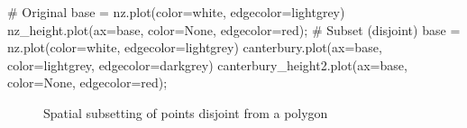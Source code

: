 \documentclass[
  letterpaper,
]{krantz}
\newenvironment{Shaded}{\begin{snugshade}}{\end{snugshade}}
\newcommand{\CommentTok}[1]{\textcolor[rgb]{0.37,0.37,0.37}{#1}}
\newcommand{\NormalTok}[1]{\textcolor[rgb]{0.00,0.23,0.31}{#1}}
\newcommand{\OperatorTok}[1]{\textcolor[rgb]{0.37,0.37,0.37}{#1}}
\newcommand{\StringTok}[1]{\textcolor[rgb]{0.13,0.47,0.30}{#1}}
\begin{document}
\begin{Shaded}
\begin{Highlighting}[]
\CommentTok{\# Original}
\NormalTok{base }\OperatorTok{=}\NormalTok{ nz.plot(color}\OperatorTok{=}\StringTok{\textquotesingle{}white\textquotesingle{}}\NormalTok{, edgecolor}\OperatorTok{=}\StringTok{\textquotesingle{}lightgrey\textquotesingle{}}\NormalTok{)}
\NormalTok{nz\_height.plot(ax}\OperatorTok{=}\NormalTok{base, color}\OperatorTok{=}\StringTok{\textquotesingle{}None\textquotesingle{}}\NormalTok{, edgecolor}\OperatorTok{=}\StringTok{\textquotesingle{}red\textquotesingle{}}\NormalTok{)}\OperatorTok{;}
\CommentTok{\# Subset (disjoint)}
\NormalTok{base }\OperatorTok{=}\NormalTok{ nz.plot(color}\OperatorTok{=}\StringTok{\textquotesingle{}white\textquotesingle{}}\NormalTok{, edgecolor}\OperatorTok{=}\StringTok{\textquotesingle{}lightgrey\textquotesingle{}}\NormalTok{)}
\NormalTok{canterbury.plot(ax}\OperatorTok{=}\NormalTok{base, color}\OperatorTok{=}\StringTok{\textquotesingle{}lightgrey\textquotesingle{}}\NormalTok{, edgecolor}\OperatorTok{=}\StringTok{\textquotesingle{}darkgrey\textquotesingle{}}\NormalTok{)}
\NormalTok{canterbury\_height2.plot(ax}\OperatorTok{=}\NormalTok{base, color}\OperatorTok{=}\StringTok{\textquotesingle{}None\textquotesingle{}}\NormalTok{, edgecolor}\OperatorTok{=}\StringTok{\textquotesingle{}red\textquotesingle{}}\NormalTok{)}\OperatorTok{;}
\end{Highlighting}
\end{Shaded}

\begin{figure}

\begin{minipage}{0.50\linewidth}



\end{minipage}%
%
\begin{minipage}{0.50\linewidth}



\end{minipage}%

\caption{\label{fig-spatial-subset-disjoint}Spatial subsetting of points
disjoint from a polygon}

\end{figure}%
\end{document}
